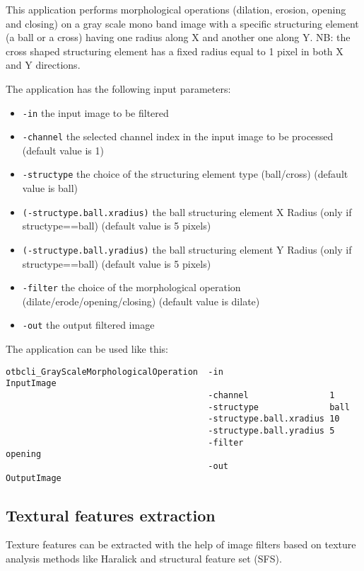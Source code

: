 This application performs morphological operations (dilation, erosion,
opening and closing) on a gray scale mono band image with a specific structuring
element (a ball or a cross) having one radius along X and another one along Y. NB:
the cross shaped structuring element has a fixed radius equal to 1 pixel in both X
and Y directions.

The  application has the following input parameters:
\begin{itemize}
\item \verb?-in? the input image to be filtered
\item \verb?-channel? the selected channel index in the input image to be processed (default value is 1)
\item \verb?-structype? the choice of the structuring element type (ball/cross) (default value is ball)
\item \verb?(-structype.ball.xradius)? the ball structuring element X Radius (only if structype==ball) (default value is 5 pixels)
\item \verb?(-structype.ball.yradius)? the ball structuring element Y Radius (only if structype==ball) (default value is 5 pixels)
\item \verb?-filter? the choice of the morphological operation (dilate/erode/opening/closing) (default value is dilate)
\item \verb?-out? the output filtered image
\end{itemize}


The application can be used like this:
\begin{verbatim}
otbcli_GrayScaleMorphologicalOperation  -in                     InputImage
                                        -channel                1
                                        -structype              ball
                                        -structype.ball.xradius 10
                                        -structype.ball.yradius 5
                                        -filter                 opening
                                        -out                    OutputImage
\end{verbatim}



\subsection{Textural features extraction}\label{ssec:texturefeatextraction}

Texture features can be extracted with the help of image filters based on
texture analysis methods like Haralick and structural feature set (SFS).

